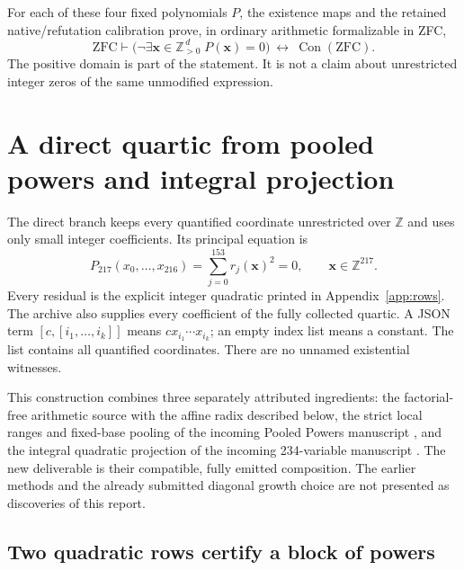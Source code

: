 \documentclass[11pt]{article}
\theoremstyle{remark}\newtheorem{remark}[theorem]{Remark}
\newcommand{\Con}{\operatorname{Con}}\newcommand{\lcm}{\operatorname{lcm}}
\newcommand{\DirectVars}{217}
\newcommand{\DirectLast}{216}
\newcommand{\DirectRowLast}{153}
\begin{document}
For each of these four fixed polynomials $P$, the existence maps and
the retained native/refutation calibration prove, in ordinary arithmetic
formalizable in ZFC,
\[
 \mathrm{ZFC}\vdash
 \bigl(\neg\exists\mathbf x\in\mathbb Z_{>0}^{\,d}\;P(\mathbf x)=0\bigr)
 \ \longleftrightarrow\ \Con(\mathrm{ZFC}).
\]
The positive domain is part of the statement. It is not a claim about
unrestricted integer zeros of the same unmodified expression.



\section{A direct quartic from pooled powers and integral projection}\label{sec:quartic}
The direct branch keeps every quantified coordinate unrestricted over
$\mathbb Z$ and uses only small integer coefficients. Its principal
equation is
\begin{equation}\label{eq:principal}
 \boxed{\displaystyle
 P_{\DirectVars}(x_0,\ldots,x_{\DirectLast})
   =\sum_{j=0}^{\DirectRowLast}r_j(\mathbf x)^2=0,
 \qquad\mathbf x\in\mathbb Z^{\DirectVars}.}
\end{equation}
Every residual is the explicit integer quadratic printed in
Appendix~\ref{app:rows}. The archive also supplies every coefficient of
the fully collected quartic. A JSON term $[c,[i_1,\ldots,i_k]]$ means
$cx_{i_1}\cdots x_{i_k}$; an empty index list means a constant.
The list contains all quantified coordinates. There are no unnamed
existential witnesses.

This construction combines three separately attributed ingredients:
the factorial-free arithmetic source with the affine radix described
below, the strict local ranges and fixed-base pooling of the incoming
Pooled Powers manuscript \cite{pooled}, and the integral quadratic
projection of the incoming 234-variable manuscript \cite{projection}.
The new deliverable is their compatible, fully emitted composition.
The earlier methods and the already submitted diagonal growth choice
are not presented as discoveries of this report.

\subsection{Two quadratic rows certify a block of powers}
\end{document}
